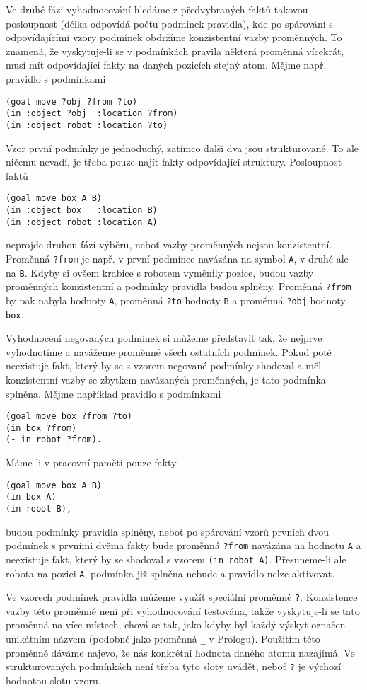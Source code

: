 Ve druhé fázi vyhodnocování hledáme z předvybraných faktů takovou posloupnost
(délka odpovídá počtu podmínek pravidla), kde po spárování s odpovídajícími
vzory podmínek obdržíme konzistentní vazby proměnných. To znamená, že
vyskytuje-li se v podmínkách pravila některá proměnná vícekrát, musí mít
odpovídající fakty na daných pozicích stejný atom.  Mějme např. pravidlo s
podmínkami
\begin{verbatim}
(goal move ?obj ?from ?to)
(in :object ?obj  :location ?from)
(in :object robot :location ?to)
\end{verbatim}
Vzor první podmínky je jednoduchý, zatímco další dva jsou strukturované. To ale
ničemu nevadí, je třeba pouze najít fakty odpovídající struktury. Posloupnost
faktů
\begin{verbatim}
(goal move box A B)
(in :object box   :location B)
(in :object robot :location A)
\end{verbatim}
neprojde druhou fází výběru, neboť vazby proměnných nejsou konzistentní.
Proměnná \verb|?from| je např. v první podmínce navázána na symbol \verb|A|, v
druhé ale na \verb|B|. Kdyby si ovšem krabice s robotem vyměnily pozice, budou
vazby proměnných konzistentní a podmínky pravidla budou splněny. Proměnná
\verb|?from| by pak nabyla hodnoty \verb|A|, proměnná \verb|?to| hodnoty
\verb|B| a proměnná \verb|?obj| hodnoty \verb|box|.

Vyhodnocení negovaných podmínek si můžeme představit tak, že nejprve vyhodnotíme
a navážeme proměnné všech ostatních podmínek. Pokud poté neexistuje fakt, který
by se s vzorem negované podmínky shodoval a měl konzistentní vazby se zbytkem navázaných
proměnných, je tato podmínka splněna. Mějme například pravidlo s podmínkami
\begin{verbatim}
(goal move box ?from ?to)
(in box ?from)
(- in robot ?from).
\end{verbatim}
Máme-li v pracovní paměti pouze fakty
\begin{verbatim}
(goal move box A B)
(in box A)
(in robot B),
\end{verbatim}
budou podmínky pravidla splněny, neboť po spárování vzorů prvních dvou podmínek
s prvními dvěma fakty bude proměnná \verb|?from| navázána na hodnotu \verb|A| a
neexistuje fakt, který by se shodoval s vzorem \verb|(in robot A)|. Přesuneme-li
ale robota na pozici \verb|A|, podmínka již splněna nebude a pravidlo nelze
aktivovat.

Ve vzorech podmínek pravidla můžeme využít speciální proměnné \verb|?|.
Konzistence vazby této proměnné není při vyhodnocování testována, takže
vyskytuje-li se tato proměnná na více místech, chová se tak, jako kdyby byl
každý výskyt označen unikátním názvem (podobně jako proměnná \verb|_| v
Prologu). Použitím této proměnné dáváme najevo, že nás konkrétní hodnota daného
atomu nazajímá. Ve strukturovaných podmínkách není třeba tyto sloty uvádět,
neboť \verb|?| je výchozí hodnotou slotu vzoru.

